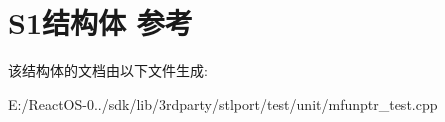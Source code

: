 \hypertarget{struct_s1}{}\section{S1结构体 参考}
\label{struct_s1}


该结构体的文档由以下文件生成\+:\begin{DoxyCompactItemize}
\item 
E\+:/\+React\+O\+S-\/0../sdk/lib/3rdparty/stlport/test/unit/mfunptr\+\_\+test.\+cpp\end{DoxyCompactItemize}
